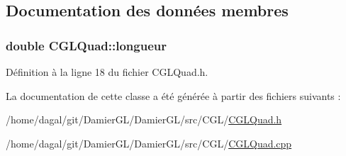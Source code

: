 \subsection{Documentation des données membres}
\hypertarget{class_c_g_l_quad_a53dcf6352ff92cde8cc4b9756e51057e}{
\subsubsection[{longueur}]{\setlength{\rightskip}{0pt plus 5cm}double C\-G\-L\-Quad\-::longueur\hspace{0.3cm}{\ttfamily [protected]}}}\label{class_c_g_l_quad_a53dcf6352ff92cde8cc4b9756e51057e}


Définition à la ligne 18 du fichier C\-G\-L\-Quad.\-h.



La documentation de cette classe a été générée à partir des fichiers suivants \-:\begin{DoxyCompactItemize}
\item 
/home/dagal/git/\-Damier\-G\-L/\-Damier\-G\-L/src/\-C\-G\-L/\hyperlink{_c_g_l_quad_8h}{C\-G\-L\-Quad.\-h}\item 
/home/dagal/git/\-Damier\-G\-L/\-Damier\-G\-L/src/\-C\-G\-L/\hyperlink{_c_g_l_quad_8cpp}{C\-G\-L\-Quad.\-cpp}\end{DoxyCompactItemize}
